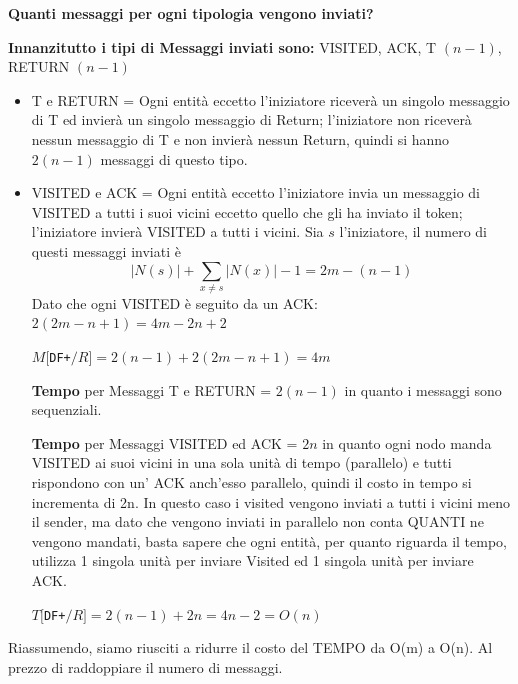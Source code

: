 \textbf{Quanti messaggi per ogni tipologia vengono inviati?} 

\textbf{Innanzitutto i tipi di Messaggi inviati sono:} VISITED, ACK, T $(n-1)$, RETURN $(n-1)$

\begin{itemize}
  \item T e RETURN = Ogni entità eccetto l'iniziatore riceverà un singolo messaggio di T ed invierà un singolo messaggio di Return; l'iniziatore non riceverà nessun messaggio di T e non invierà nessun Return, quindi si hanno $2(n-1)$ messaggi di questo tipo.
    
  \item VISITED e ACK = Ogni entità eccetto l'iniziatore invia un messaggio di VISITED a tutti i suoi vicini eccetto quello che gli ha inviato il token; l'iniziatore invierà VISITED a tutti i vicini. Sia $s$ l'iniziatore, il numero di questi messaggi inviati è
  $$|N(s)| + \sum_{x \neq s} |N(x)| - 1 = 2m - (n - 1)$$
  Dato che ogni VISITED è seguito da un ACK:
  $2(2m - n + 1) = 4m -2n + 2$

\begin{center}
  $M[$\texttt{DF+}$/R] = 2(n-1) + 2(2m-n+1) = 4m$
\end{center}

  \textbf{Tempo} per Messaggi T e RETURN = $2(n-1)$ in quanto i messaggi sono sequenziali.
  
  \textbf{Tempo} per Messaggi VISITED ed ACK = $2n$ in quanto ogni nodo manda VISITED ai suoi vicini in una sola unità di tempo (parallelo) e tutti rispondono con un' ACK anch'esso parallelo, quindi il costo in tempo si incrementa di 2n. In questo caso i visited vengono inviati a tutti i vicini meno il sender, ma dato che vengono inviati in parallelo non conta QUANTI ne vengono mandati, basta sapere che ogni entità, per quanto riguarda il tempo, utilizza 1 singola unità per inviare Visited ed 1 singola unità per inviare ACK.
  
  \begin{center}
  $T[$\texttt{DF+}$/R] = 2(n-1) + 2n = 4n - 2 = O(n)$\\
\end{center}
\end{itemize}

Riassumendo, siamo riusciti a ridurre il costo del TEMPO da O(m) a O(n). Al prezzo di raddoppiare il numero di messaggi. 


